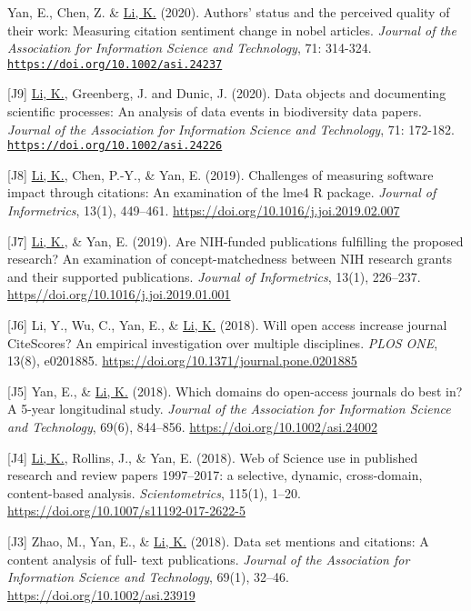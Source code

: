 \documentclass[margin, 10pt]{res} %
\begin{document}
\begin{resume}
[J10] Yan, E., Chen, Z. \& \underline{Li, K.} (2020). Authors' status and the perceived quality of their work: Measuring citation sentiment change in nobel articles. \textit{Journal of the Association for Information Science and Technology}, 71: 314-324. \href{https://doi.org/10.1002/asi.24237}{\nolinkurl{https://doi.org/10.1002/asi.24237}}

[J9] \underline{Li, K.}, Greenberg, J. and Dunic, J. (2020). Data objects and documenting scientific processes: An analysis of data events in biodiversity data papers. \textit{Journal of the Association for Information Science and Technology}, 71: 172-182. \href{https://doi.org/10.1002/asi.24226}{\nolinkurl{https://doi.org/10.1002/asi.24226}}

[J8] \underline{Li, K.}, Chen, P.-Y., \& Yan, E. (2019). Challenges of measuring software impact through citations: An examination of the lme4 R package. \textit{Journal of Informetrics}, 13(1), 449–461. \href{https://doi.org/10.1016/j.joi.2019.02.007}{https://doi.org/10.1016/j.joi.2019.02.007}

[J7] \underline{Li, K.}, \& Yan, E. (2019). Are NIH-funded publications fulfilling the proposed research? An examination of concept-matchedness between NIH research grants and their supported publications. \textit{Journal of Informetrics}, 13(1), 226–237. \href{https//doi.org/10.1016/j.joi.2019.01.001}{https//doi.org/10.1016/j.joi.2019.01.001}

[J6] Li, Y., Wu, C., Yan, E., \& \underline{Li, K.} (2018). Will open access increase journal CiteScores? An empirical investigation over multiple disciplines. \textit{PLOS ONE}, 13(8), e0201885. \href{https://doi.org/10.1371/journal.pone.0201885}{https://doi.org/10.1371/journal.pone.0201885}

[J5] Yan, E., \& \underline{Li, K.} (2018). Which domains do open-access journals do best in? A 5-year longitudinal study. \textit{Journal of the Association for Information Science and Technology}, 69(6), 844–856. \href{https://doi.org/10.1002/asi.24002}{https://doi.org/10.1002/asi.24002}

[J4] \underline{Li, K.}, Rollins, J., \& Yan, E. (2018). Web of Science use in published research and review papers 1997–2017: a selective, dynamic, cross-domain, content-based analysis. \textit{Scientometrics}, 115(1), 1–20. \href{https://doi.org/10.1007/s11192-017-2622-5}{https://doi.org/10.1007/s11192-017-2622-5}

[J3] Zhao, M., Yan, E., \& \underline{Li, K.} (2018). Data set mentions and citations: A content analysis of full- text publications. \textit{Journal of the Association for Information Science and Technology}, 69(1), 32–46. \href{https://doi.org/10.1002/asi.23919}{https://doi.org/10.1002/asi.23919}


\end{resume}
\end{document}
